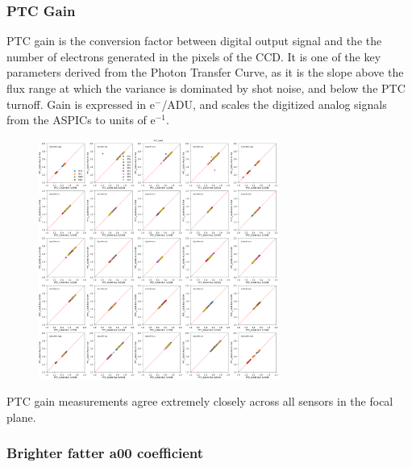 \subsubsection{PTC Gain}\label{ptc-gain}

PTC gain is the conversion factor between digital output signal and the the number of electrons generated in the pixels of the CCD. It is one of the key parameters derived from the Photon Transfer
Curve, as it is the slope above the flux range at which the variance is dominated by shot
noise, and below the PTC turnoff. Gain is expressed in e$^-$/ADU, and scales the digitized analog signals from the ASPICs to units of e$^{-1}$.

\begin{figure}[H]
\begin{centering}
\includegraphics[width=0.7\textwidth]{sections/figures/baselineCharacterization/13591_E749_PTC_GAIN.png}
\end{centering}
\end{figure}

PTC gain measurements agree extremely closely across all sensors in the
focal plane.

\subsubsection{\texorpdfstring{Brighter fatter a{00}
coefficient}{Brighter fatter a00 coefficient}}\label{brighter-fatter-a00-coefficient}

